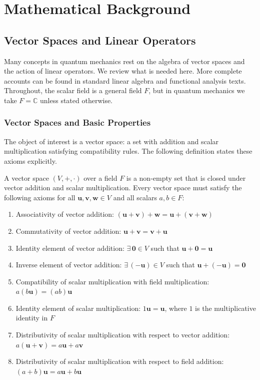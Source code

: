 \chapter{Mathematical Background}\label{sec:mathematical_background}
\section{Vector Spaces and Linear Operators}\label{sec:vector_spaces_and_linear_operators}
Many concepts in quantum mechanics rest on the algebra of vector spaces and the action of linear operators. We review what is needed here. More complete accounts can be found in standard linear algebra and functional analysis texts. Throughout, the scalar field is a general field $F$, but in quantum mechanics we take $F=\mathbb{C}$ unless stated otherwise.
\subsection{Vector Spaces and Basic Properties}\label{sec:vector_spaces_basic_properties}
The object of interest is a vector space: a set with addition and scalar multiplication satisfying compatibility rules. The following definition states these axioms explicitly.
\begin{definition}
A vector space $(V,+,\cdot)$ over a field $F$ is a non-empty set that is closed under vector addition and scalar multiplication. Every vector space must satisfy the following axioms for all $\symbf{u},\symbf{v},\symbf{w}\in V$ and all scalars $a,b\in F$:
\begin{enumerate}\def\labelenumi{\arabic{enumi}.}
\item Associativity of vector addition: $(\symbf{u}+\symbf{v})+\symbf{w}=\symbf{u}+(\symbf{v}+\symbf{w})$
\item Commutativity of vector addition: $\symbf{u}+\symbf{v}=\symbf{v}+\symbf{u}$
\item Identity element of vector addition: $\exists\,\symbf{0}\in V$ such that $\symbf{u}+\symbf{0}=\symbf{u}$
\item Inverse element of vector addition: $\exists\,(-\symbf{u})\in V$ such that $\symbf{u}+(-\symbf{u})=\symbf{0}$
\item Compatibility of scalar multiplication with field multiplication: $a(b\symbf{u})=(ab)\symbf{u}$
\item Identity element of scalar multiplication: $1\symbf{u}=\symbf{u}$, where $1$ is the multiplicative identity in $F$
\item Distributivity of scalar multiplication with respect to vector addition: $a(\symbf{u}+\symbf{v})=a\symbf{u}+a\symbf{v}$
\item Distributivity of scalar multiplication with respect to field addition: $(a+b)\symbf{u}=a\symbf{u}+b\symbf{u}$
\end{enumerate}
\end{definition}
